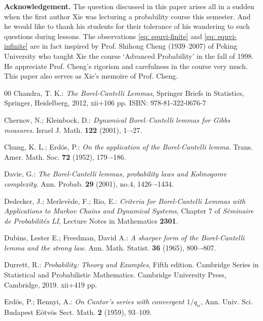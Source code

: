 \documentclass{article}
\numberwithin{equation}{section}
\begin{document}
\noindent \textbf{Acknowledgement.\;} The question discussed in this paper arises all in a sudden when the first author Xie was lecturing a probability course this semester. And he would like to thank his students for
their tolerance of his wandering to such questions during lessons. The observations \eqref{eq: equvi-finite} and \eqref{eq: equvi-infinite} are in fact inspired by Prof. Shihong Cheng (1939--2007) of Peking University
who taught Xie the course `Advanced Probability' in the fall of 1998. He appreciate Prof. Cheng's rigorism and carefulness in the course very much. This paper also serves as Xie's memoire of Prof. Cheng.
\begin{thebibliography}{00}
 Chandra, T. K.:
{\it The Borel-Cantelli Lemmas}, Springer Briefs in Statistics,
Springer, Heidelberg, 2012, xii+106 pp. ISBN: 978-81-322-0676-7

 Chernov, N.; Kleinbock, D.:
{\em Dynamical Borel–Cantelli lemmas for Gibbs measures}. 
Israel J. Math. \textbf{122} (2001), 1–-27.

 Chung, K. L.; Erdös, P.:
{\em On the application of the Borel-Cantelli lemma}.
Trans. Amer. Math. Soc. \textbf{72} (1952), 179–-186.

 Davie, G.:
{\em The Borel-Cantelli lemmas, probability laws and Kolmogorov complexity}.
Ann. Probab. \textbf{29} (2001), no.4, 1426–-1434.

 Dedecker, J.; Merlev\`{e}de, F.; Rio, E.:
{\em Criteria for Borel-Cantelli Lemmas with Applications to Markov Chains and Dynamical Systems},
Chapter 7 of {\it S\'{e}minaire de Probabilit\'{e}s LI}, Lecture Notes in Mathematics \textbf{2301}.

 Dubins, Lester E.; Freedman, David A.:
{\em A sharper form of the Borel-Cantelli lemma and the strong law}.
Ann. Math. Statist. \textbf{36} (1965), 800–-807.

 Durrett, R.:
{\it Probability: Theory and Examples},
Fifth edition. Cambridge Series in Statistical and Probabilistic Mathematics.
Cambridge University Press, Cambridge, 2019. xii+419 pp.

 Erd\"{o}s, P.; Rennyi, A.:
{\em On Cantor's series with convergent $1/q_n$},
Ann. Univ. Sci. Budapest E\"{o}tv\"{o}s Sect. Math. \textbf{2} (1959), 93--109.


\end{thebibliography}
\end{document}
